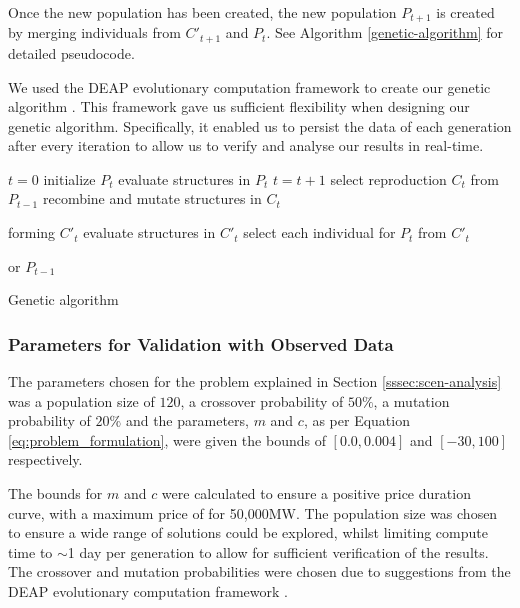 Once the new population has been created, the new population $P_{t+1}$ is created by merging individuals from $C'_{t+1}$ and $P_{t}$. See Algorithm \ref{genetic-algorithm} for detailed pseudocode.

We used the DEAP evolutionary computation framework to create our genetic algorithm \cite{Gagn2012}. This framework gave us sufficient flexibility when designing our genetic algorithm. Specifically, it enabled us to persist the data of each generation after every iteration to allow us to verify and analyse our results in real-time.

%
\begin{algorithm}[t]
	\begin{algorithmic}[1]
		\State $t=0$
		\State initialize $P_{t}$
		\State evaluate structures in $P_{t}$
		\State $t=t+1$
		\State select reproduction $C_{t}$ from $P_{t-1}$
		\State recombine and mutate structures in $C_{t}$
		
		forming $C'_{t}$
		\State evaluate structures in $C'_{t}$
		\State select each individual for $P_{t}$ from $C'_{t}$ 
		
		or $P_{t-1}$
		\EndWhile
		\caption{Genetic algorithm \cite{FogelDavidB2009}}
		\label{genetic-algorithm}
	\end{algorithmic}
\end{algorithm}

\subsubsection{Parameters for Validation with Observed Data}
\label{ssec:ga_params_valid}

The parameters chosen for the problem explained in Section \ref{sssec:scen-analysis} was a population size of $120$, a crossover probability of $50\%$, a mutation probability of $20\%$ and the parameters, $m$ and $c$, as per Equation \ref{eq:problem_formulation}, were given the bounds of $[0.0, 0.004]$ and $[-30, 100]$ respectively. 

The bounds for $m$ and $c$ were calculated to ensure a positive price duration curve, with a maximum price of  for 50,000MW. The population size was chosen to ensure a wide range of solutions could be explored, whilst limiting compute time to ${\sim}$1 day per generation to allow for sufficient verification of the results. The crossover and mutation probabilities were chosen due to suggestions from the DEAP evolutionary computation framework \cite{Gagn2012}.


